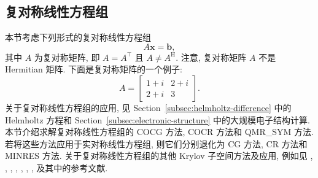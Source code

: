 \subsection{{复对称线性方程组}}\label{sec:complex-symmetric-linear-systems}
{本节考虑下列形式的复对称线性方程组}
\[A\bm x=\bm b,\]
{其中 $A$ 为复对称矩阵, 即 $A=A^{\top}$ 且 $A\ne A^{\mathrm H}$. 注意, 复对称矩阵 $A$ 不是 Hermitian 矩阵. 下面是复对称矩阵的一个例子:}
\[A=\begin{bmatrix}1+i&2+i\\2+i&3\end{bmatrix}.\]
{关于复对称线性方程组的应用, 见 Section\ \ref{subsec:helmholtz-difference} 中的 Helmholtz 方程和 Section\ \ref{subsec:electronic-structure} 中的大规模电子结构计算. 本节介绍求解复对称线性方程组的 COCG 方法, COCR 方法和 QMR\_SYM 方法. 若将这些方法应用于实对称线性方程组, 则它们分别退化为 CG 方法, CR 方法和 MINRES 方法. 关于复对称线性方程组的其他 Krylov 子空间方法及应用, 例如见 , , , , , , ,  及其中的参考文献.}
